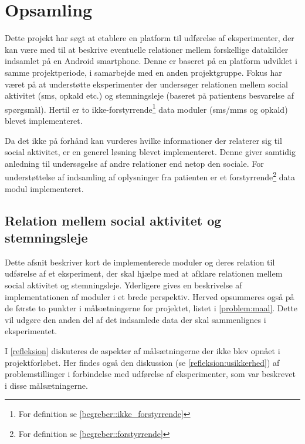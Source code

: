 \chapter{Opsamling}
Dette projekt har søgt at etablere en platform til udførelse af eksperimenter, der kan være med til at beskrive eventuelle relationer mellem forskellige datakilder indsamlet på en Android smartphone.
Denne er baseret på en platform\citefaelles{} udviklet i samme projektperiode, i samarbejde med en anden projektgruppe.
Fokus har været på at understøtte eksperimenter der undersøger relationen mellem social aktivitet (sms, opkald etc.) og stemningsleje (baseret på patientens besvarelse af spørgsmål).
Hertil er to ikke-forstyrrende\footnote{For definition se \cref{begreber::ikke_forstyrrende}} data moduler (sms/mms og opkald) blevet implementeret.

Da det ikke på forhånd kan vurderes hvilke informationer der relaterer sig til social aktivitet, er en generel løsning blevet implementeret.
Denne giver samtidig anledning til undersøgelse af andre relationer end netop den sociale.
For understøttelse af indsamling af oplysninger fra patienten er et forstyrrende\footnote{For definition se \cref{begreber::forstyrrende}} data modul implementeret.


\section{Relation mellem social aktivitet og stemningsleje}
Dette afsnit beskriver kort de implementerede moduler og deres relation til udførelse af et eksperiment, der skal hjælpe med at afklare relationen mellem social aktivitet og stemningsleje.
Yderligere gives en beskrivelse af implementationen af moduler i et brede perspektiv.
Herved opsummeres også på de første to punkter i målsætningerne for projektet, listet i \cref{problem:maal}.
Dette vil udgøre den anden del af det indsamlede data der skal sammenlignes i eksperimentet.

I \cref{refleksion} diskuteres de aspekter af målsætningerne der ikke blev opnået i projektforløbet.
Her findes også den diskussion (se \cref{refleksion:usikkerhed}) af problemstillinger i forbindelse med udførelse af eksperimenter, som var beskrevet i disse målsætningerne.

